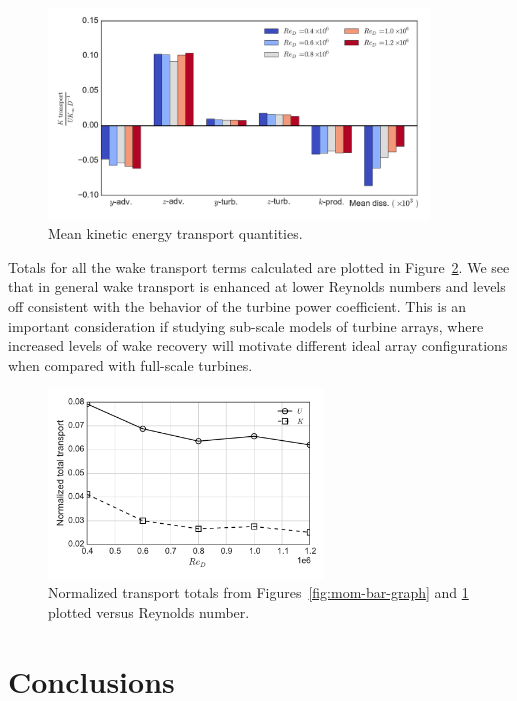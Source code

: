 \documentclass[energies,article,accept,moreauthors,pdftex,12pt,a4paper]{mdpi}
\begin{document}
\begin{figure}[ht!]
\centering
\includegraphics[width=0.9\textwidth]{figures/K_trans_bar_graph}
\caption{Mean kinetic energy transport quantities.}
\label{fig:K-bar-graph}
\end{figure}


Totals for all the wake transport terms calculated are plotted in
Figure~\ref{fig:wake-trans-totals}. We see that in general wake transport is
enhanced at lower Reynolds numbers and levels off consistent with the behavior
of the  turbine power coefficient. This is an important consideration if
studying sub-scale models of turbine arrays, where increased levels of wake
recovery will motivate different ideal array configurations when compared with
full-scale turbines.


\begin{figure}[ht!]
\centering
\includegraphics[width=0.65\textwidth]{figures/wake_trans_totals}
\caption{Normalized transport totals from Figures~\ref{fig:mom-bar-graph} and 
\ref{fig:K-bar-graph} plotted versus Reynolds number.}
\label{fig:wake-trans-totals}
\end{figure}


\section{Conclusions}
\end{document}
